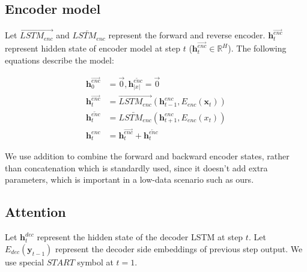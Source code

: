 \subsection{Encoder model}
 Let $\overrightarrow{LSTM_{enc}}$ and $\overleftarrow{LSTM_{enc}}$ represent the forward and reverse encoder. $\mathbf{h}^{\overrightarrow{enc}}_{t}$ represent hidden state of encoder model at step $t$ ($\mathbf{h}^{\overrightarrow{enc}}_{t} \in \mathbb{R}^{H} $).
The following equations describe the model:
\begin{center}
\footnotesize
\begin{align*}
    \mathbf{h}^{\overrightarrow{enc}}_0 &=\overrightarrow{0},  \mathbf{h}^{\overleftarrow{enc}}_{|x|} = \overrightarrow{0} \\
    \mathbf{h}^{\overrightarrow{enc}}_{t} &= \overrightarrow{LSTM_{enc}}(\mathbf{h}^{enc}_{t-1},{E_{enc}}({\mathbf{x}_{t}})) \\
    \mathbf{h}^{\overleftarrow{enc}}_{t} &= \overleftarrow{LSTM_{enc}}(\mathbf{h}^{enc}_{t+1},{E_{enc}}({x_{t}})) \\
    \mathbf{h}^{enc}_{t} &= \mathbf{h}^{\overrightarrow{enc}}_{t} + \mathbf{h}^{\overleftarrow{enc}}_{t} 
\end{align*}
\normalsize
\end{center}
We use addition to combine the forward and backward encoder states, rather than concatenation which is standardly used, since it doesn't add extra parameters, which is important in a low-data scenario such as ours. 


\subsection{Attention}

Let $\mathbf{h}_t^{dec}$ represent the hidden state of the decoder LSTM at step $t$. Let $E_{dec}(\mathbf{y}_{t-1})$ represent the decoder side embeddings of previous step output. We use special $START$ symbol at $t=1$. 

